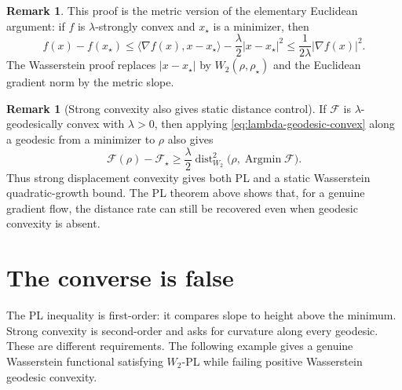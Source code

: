 \documentclass[11pt]{article}
\theoremstyle{definition}
\newtheorem{remark}[theorem]{Remark}
\newcommand{\F}{\mathcal F}
\newcommand{\W}{W_2}
\newcommand{\rhostar}{\rho_\star}
\newcommand{\distW}{\operatorname{dist}_{\W}}
\begin{document}
\begin{remark}
This proof is the metric version of the elementary Euclidean argument: if $f$ is $\lambda$-strongly convex and $x_\star$ is a minimizer, then
\[
        f(x)-f(x_\star)
        \le \langle \nabla f(x),x-x_\star\rangle
          -\frac{\lambda}{2}|x-x_\star|^2
        \le \frac{1}{2\lambda}|\nabla f(x)|^2.
\]
The Wasserstein proof replaces $|x-x_\star|$ by $\W(\rho,\rhostar)$ and the Euclidean gradient norm by the metric slope.
\end{remark}

\begin{remark}[Strong convexity also gives static distance control]
If $\F$ is $\lambda$-geodesically convex with $\lambda>0$, then applying \eqref{eq:lambda-geodesic-convex} along a geodesic from a minimizer to $\rho$ also gives
\[
        \F(\rho)-\F_\star
        \ge \frac{\lambda}{2}
        \distW^2\bigl(\rho,\operatorname{Argmin}\F\bigr).
\]
Thus strong displacement convexity gives both PL and a static Wasserstein quadratic-growth bound. The PL theorem above shows that, for a genuine gradient flow, the distance rate can still be recovered even when geodesic convexity is absent.
\end{remark}

\section{The converse is false}

The PL inequality is first-order: it compares slope to height above the minimum. Strong convexity is second-order and asks for curvature along every geodesic. These are different requirements. The following example gives a genuine Wasserstein functional satisfying $\W$-PL while failing positive Wasserstein geodesic convexity.
\end{document}
